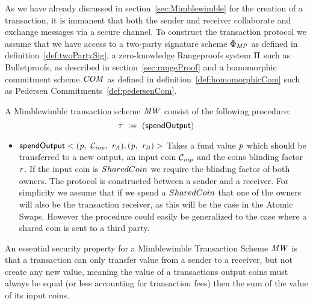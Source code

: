 As we have already discussed in section~\ref{sec:Mimblewimble} for the creation of a transaction, it is immanent that both the sender and receiver collaborate and exchange messages via a secure channel.
To construct the transaction protocol we assume that we have access to a two-party signature scheme $\Phi_{\mathit{MP}}$ as defined in definition~\ref{def:twoPartySig}, a zero-knowledge Rangeproofs system $\Pi$ such as Bulletproofs, as
described in section~\ref{sec:rangeProof} and a homomorphic commitment scheme $\mathit{COM}$ as defined in definition~\ref{def:homomorphicCom} such as Pedersen Commitments~\ref{def:pedersenCom}.
\begin{definition}
    \label{def:tx}
    A Mimblewimble transaction scheme $\mathit{MW}$ consist of the following procedure:
    \[ \tau ~:=~ ( \mathsf{spendOutput} ) \]
    \begin{itemize}
        \item $\mathsf{spendOutput}<(\mathit{p} ,~ \mathcal{C}_{\mathit{inp}} ,~ \mathit{r}_{\mathit{A}}), (\mathit{p} ,~ \mathit{r}_{\mathit{B}})>$ Takes a fund value $\mathit{p}$ which should be transferred to a new output, an input coin $\mathcal{C}_{\mathit{inp}}$ and the coins blinding factor $\mathit{r}$. If the input coin is $SharedCoin$ we require the blinding factor of both owners. The protocol is constructed between a sender and a receiver. For simplicity we assume that if we spend a $SharedCoin$ that one of the owners will also be the transaction receiver, as this will be the case in the Atomic Swaps. However the procedure could easily be generalized to the case where a shared coin is sent to a third party.
    \end{itemize}
\end{definition}

An essential security property for a Mimblewimble Transaction Scheme $\mathit{MW}$ is that a transaction can only transfer value from a sender to a receiver, but not create any new value, meaning the value
of a transactions output coins must always be equal (or less accounting for transaction fees) then the sum of the value of its input coins.

\begin{definition}

\end{definition}

\begin{definition}

\end{definition}

